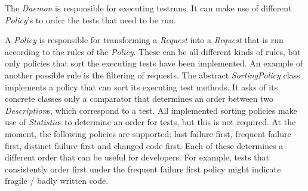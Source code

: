 \documentclass[i2]{oss}
\newcommand{\class}[1]{\emph{#1}}
\begin{document}
The \class{Daemon} is responsible for executing testruns.
It can make use of different \class{Policy}'s to order the tests that 
need to be run. 

A \class{Policy} is responsible for transforming a \class{Request} into a \class{Request} that is run according to the rules of the \class{Policy}. 
These can be all different kinds of rules, but only policies that sort the executing tests have been implemented. 
An example of another possible rule is the filtering of requests.
The abstract \class{SortingPolicy} class implements a policy that can sort its executing test methods. It asks of its concrete classes only a comparator that determines an order between two \class{Description}s, which correspond to a test.
All implemented sorting policies make use of \class{Statistic}s to determine
an order for tests, but this is not required.
At the moment, the following policies are supported: last failure first, 
frequent failure first, distinct failure first and changed code 
first.
Each of these determines a different order that can be useful for
developers.
For example, tests that consistently order first under the frequent
failure first policy might indicate fragile / badly written code. 
\end{document}
